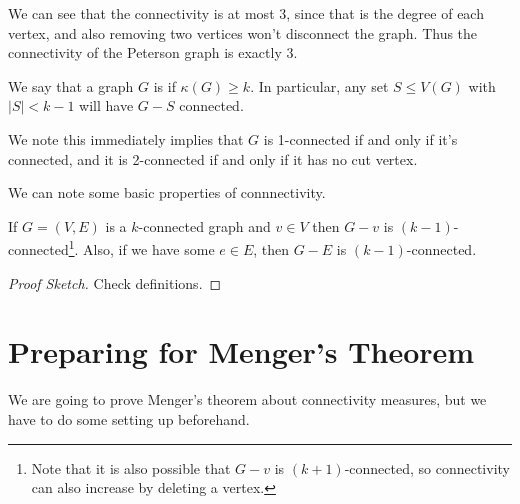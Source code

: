 \documentclass[a4paper]{scrreprt}
\begin{document}
\begin{example}
\begin{center}

	\end{center}
We can see that the connectivity is at most $3$, since that is the degree of each vertex, and also removing two vertices won't disconnect the graph. Thus the connectivity of the Peterson graph is exactly 3.
\end{example}

\begin{definition}[$k$-Connected]
We say that a graph $G$ is  if $\kappa(G) \geq k$. In particular, any set $S \leq V(G)$ with $|S| < k - 1$	will have $G - S$ connected.
\end{definition}

We note this immediately implies that $G$ is 1-connected if and only if it's connected, and it is 2-connected if and only if it has no cut vertex.

We can note some basic properties of connnectivity.

\begin{lemma}
	If $G = (V, E)$ is a $k$-connected graph and $v \in V$ then $G - v$ is $(k - 1)$-connected\footnote{Note that it is also possible that $G - v$ is $(k + 1)$-connected, so connectivity can also increase by deleting a vertex.}. 
	Also, if we have some $e \in E$, then $G - E$ is $(k - 1)$-connected.
\end{lemma}
\begin{proof}[Proof Sketch]
Check definitions.
\end{proof}

\section{Preparing for Menger's Theorem}

We are going to prove Menger's theorem about connectivity measures, but we have to do some setting up beforehand.
\end{document}
